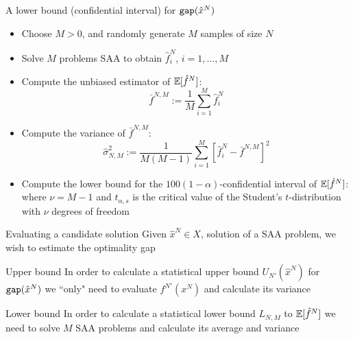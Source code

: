 \begin{frame}{A lower bound (confidential interval) for ${\tt gap}(\hat x^N)$}
\begin{itemize}
\item Choose $M>0$, and randomly generate $M$ samples of size  $N$
\pula
\item Solve $M$ problems SAA to obtain $\hat f^N_i$, $i=1,\ldots, M$
\pula
\item Compute the unbiased estimator of $\mathbb{E}[\hat f^N]$:
\[
\bar f^{N,M} :=\frac 1 M \sum_{i=1}^M \hat f^N_i
\]
\pula
\item Compute the variance of $\bar f^{N,M}$:
\[
\hat \sigma^2_{N,M}:=\frac{1}{M(M-1)}\sum_{i=1}^M[\hat f^{N}_i - \bar f^{N,M} ]^2
\]
\pula
\item Compute the lower bound for the $100(1-\alpha)$-confidential interval  of $\mathbb{E}[\hat f^N]$:
\azul{\[
L_N':= \bar f^{N,M} - t_{\alpha,\nu}\hat \sigma_{N,M}\,,
\]
}
where $\nu=M-1$ and $t_{\alpha,s}$ is the critical value of the Student's $t$-distribution with $\nu$ degrees of freedom 
\end{itemize}
\end{frame}
%
\begin{frame}{Evaluating a candidate solution}
Given $ \hat x^N \in X $, solution of a SAA problem, we wish to estimate the optimality gap
\azul{
\[
{\tt gap} (\hat x^N) = f (\hat x^N) -f^* \geq 0
\]
}
\begin{block}{Upper bound}
In order to calculate a statistical upper bound  $ U_{N '} (\hat x^N) $ for $ {\tt gap} (\hat x^N) $  we ``only" need to evaluate $ f^{N'}( x^N) $ and calculate its variance
\azul{
\[
U_{N}'(\hat x^N):= f^{N'}(\hat x^N) + z_{\alpha}\hat \sigma_{N'}(\hat x^N)
\]
}
\end{block}
\pause
\begin{block}{Lower bound}
In order to calculate a statistical lower bound $ L_{N, M}$ to $\mathbb{E}[\hat f^N]$ we need to solve $ M $ SAA problems
and calculate its average and variance
\azul{\[
L_N':= \bar f^{N,M} - t_{\alpha,\nu}\hat \sigma_{N,M}
\]
}
\end{block}
\end{frame}


